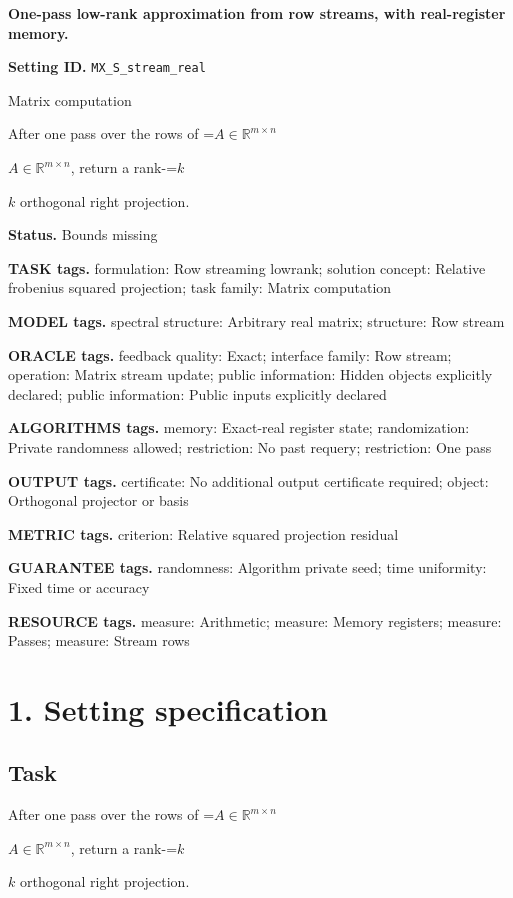\documentclass[10pt,a4paper]{article}
\newcommand{\AtlasMath}[1]{\par\begingroup\centering\setbox0=\hbox{$\displaystyle #1$}\ifdim\wd0>1.4\linewidth\typeout{ATLAS WIDE FORMULA: \the\wd0}\fi\ifdim\wd0>\linewidth\resizebox{\linewidth}{!}{\box0}\else\box0\fi\par\endgroup}
\newcommand{\AtlasInlineMath}[1]{\begingroup\setbox0=\hbox{$#1$}\ifdim\wd0>.4\linewidth\endgroup\AtlasMath{#1}\else\endgroup$#1$\fi}
\begin{document}
\raggedright

{\LARGE\bfseries\sffamily\color{AtlasNavy} One-pass low-rank approximation from row streams, with real-register memory.\par}\vspace{5pt}
\textbf{Setting ID.} \texttt{MX\_\allowbreak{}S\_\allowbreak{}stream\_\allowbreak{}real}

Matrix computation

After one pass over the rows of \AtlasInlineMath{A\in\mathbb{R}^{m\times n}}, return a rank-\AtlasInlineMath{k} orthogonal right projection.

\textbf{Status.} Bounds missing

\textbf{TASK tags.} formulation: Row streaming lowrank; solution concept: Relative frobenius squared projection; task family: Matrix computation

\textbf{MODEL tags.} spectral structure: Arbitrary real matrix; structure: Row stream

\textbf{ORACLE tags.} feedback quality: Exact; interface family: Row stream; operation: Matrix stream update; public information: Hidden objects explicitly declared; public information: Public inputs explicitly declared

\textbf{ALGORITHMS tags.} memory: Exact-real register state; randomization: Private randomness allowed; restriction: No past requery; restriction: One pass

\textbf{OUTPUT tags.} certificate: No additional output certificate required; object: Orthogonal projector or basis

\textbf{METRIC tags.} criterion: Relative squared projection residual

\textbf{GUARANTEE tags.} randomness: Algorithm private seed; time uniformity: Fixed time or accuracy

\textbf{RESOURCE tags.} measure: Arithmetic; measure: Memory registers; measure: Passes; measure: Stream rows

\section{1. Setting specification}
\subsection{Task}
After one pass over the rows of \AtlasInlineMath{A\in\mathbb{R}^{m\times n}}, return a rank-\AtlasInlineMath{k} orthogonal right projection.
\end{document}
